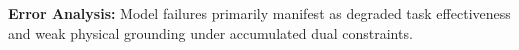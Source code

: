 







\begin{takeaway}
\label{sec:error-analysis}
\textbf{Error Analysis: }
Model failures primarily manifest as degraded task effectiveness and weak physical grounding under accumulated dual constraints.
\end{takeaway}



